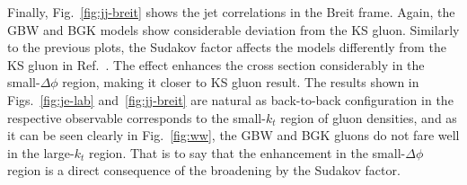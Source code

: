 \documentclass[12pt]{article}
\numberwithin{equation}{section}
\numberwithin{table}{section}
\numberwithin{figure}{section}
\begin{document}
Finally, Fig.~\ref{fig:jj-breit} shows the jet correlations in the Breit frame. Again, the GBW and BGK models show considerable deviation from the KS gluon. Similarly to the previous plots, the Sudakov factor affects the models differently from the KS gluon in Ref.~\cite{vanHameren:2021sqc}.
The effect enhances the cross section considerably in the small-$\Delta\phi$ region, making it closer to KS gluon result.
The results shown in Figs.~\ref{fig:je-lab} and~\ref{fig:jj-breit} are natural as back-to-back configuration in the respective observable corresponds to the small-$k_t$ region of gluon densities, and as it can be seen clearly in Fig.~\ref{fig:ww}, the GBW and BGK gluons do not fare well in the large-$k_t$ region. 
That is to say that the enhancement in the small-$\Delta\phi$ region is a direct consequence of the broadening by the Sudakov factor. 
\end{document}
